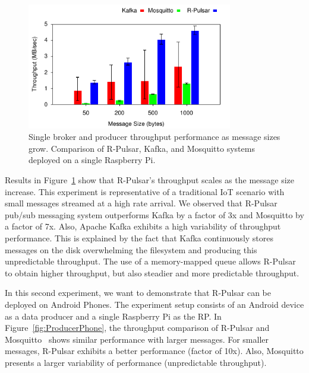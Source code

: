 \begin{figure}[h]
  \centering
  \includegraphics[width=0.8\textwidth]{Results/ProducerBar}
    \caption{Single broker and producer throughput performance as message sizes grow. Comparison of R-Pulsar, Kafka, and Mosquitto systems deployed on a single Raspberry Pi.}
  \label{fig:ProducerBar}
\end{figure}

Results in Figure~\ref{fig:ProducerBar} show that R-Pulsar's throughput scales as the message size increase. This experiment is representative of a traditional IoT scenario with small messages streamed at a high rate arrival.
We observed that R-Pulsar pub/sub messaging system outperforms Kafka by a factor of 3x and Mosquitto by a factor of 7x. Also, Apache Kafka exhibits a high variability of throughput performance. This is explained by the fact that Kafka continuously stores messages on the disk overwhelming the filesystem and producing this unpredictable throughput.
The use of a memory-mapped queue allows R-Pulsar to obtain higher throughput, but also steadier and more predictable throughput.

In this second experiment, we want to demonstrate that R-Pulsar can be deployed on  Android Phones. The experiment setup consists of an Android device as a data producer and a single Raspberry Pi as the RP. In Figure~\ref{fig:ProducerPhone}, the throughput comparison of R-Pulsar and Mosquitto~\cite{mosquitto} shows similar performance with larger messages. For smaller messages, R-Pulsar exhibits a better performance (factor of 10x). Also, Mosquitto presents a larger variability of performance (unpredictable throughput).

